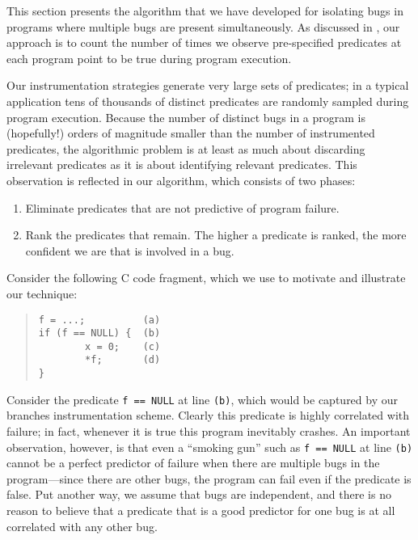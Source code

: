This section presents the algorithm that we have developed for
isolating bugs in programs where multiple bugs are present
simultaneously.  As discussed in , our
approach is to count the number of times we observe pre-specified
predicates at each program point to be true during program
execution.  

Our instrumentation strategies generate very large sets
of predicates; in a typical application tens of thousands of distinct
predicates are randomly sampled during program execution.  Because the
number of distinct bugs in a program is (hopefully!) orders of
magnitude smaller than the number of instrumented predicates, the
algorithmic problem is at least as much about discarding irrelevant
predicates as it is about identifying relevant predicates.  This
observation is reflected in our algorithm, which consists of two phases:
\begin{enumerate}
\item Eliminate predicates that are not predictive of program failure.

\item Rank the predicates that remain.  The higher a predicate is ranked,
the more confident we are that is involved in a bug.
\end{enumerate}

Consider the following C code fragment, which we use to motivate and illustrate
our technique:
\begin{quote}
\begin{verbatim}
f = ...;          (a)
if (f == NULL) {  (b)
        x = 0;    (c)
        *f;       (d)
}
\end{verbatim}
\end{quote}
Consider the predicate {\tt f == NULL} at line {\tt (b)}, which would
be captured by our branches instrumentation scheme.  Clearly
this predicate is highly correlated with failure; in fact, whenever it
is true this program inevitably crashes.  An important observation,
however, is that even a ``smoking gun'' such as {\tt f == NULL} at
line {\tt (b)} cannot be a perfect predictor of failure when there are
multiple bugs in the program---since there are other bugs, the program can fail
even if the predicate is false.  Put another way, we assume
that bugs are independent, and there is no reason to believe that
a predicate that is a good predictor for one bug is at all correlated
with any other bug.

